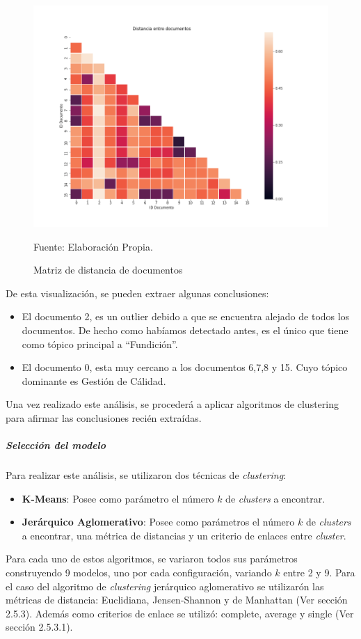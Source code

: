     \begin{figure}[H]
        \centering
        \includegraphics[width=1\textwidth]{figures/Clustering/distancia.png}
        \caption{\label{fig:DistanceMatrix} Matriz de distancia de documentos} Fuente: Elaboración Propia.
    \end{figure}
    
    De esta visualización, se pueden extraer algunas conclusiones:
    \begin{itemize}
        \item El documento 2, es un outlier debido a que se encuentra alejado de todos los documentos. De hecho como habíamos detectado antes, es el único que tiene como tópico principal a ``Fundición''. 
        \item El documento 0, esta muy cercano a los documentos 6,7,8 y 15. Cuyo tópico dominante es Gestión de Cálidad.
    \end{itemize}
    Una vez realizado este análisis, se procederá a aplicar algoritmos de clustering para afirmar las conclusiones recién extraídas.
\subparagraph{Selección del modelo}
\subparagraph*{}
    Para realizar este análisis, se utilizaron dos técnicas de \textit{clustering}: 
    \begin{itemize}
        \item \textbf{K-Means}: Posee como parámetro el número $k$ de \textit{clusters} a encontrar.
        \item \textbf{Jerárquico Aglomerativo}: Posee como parámetros el número $k$ de \textit{clusters} a encontrar, una métrica de distancias y un criterio de enlaces entre \textit{cluster}. 
    \end{itemize}
    Para cada uno de estos algoritmos, se variaron todos sus parámetros construyendo 9 modelos, uno por cada configuración, variando $k$ entre 2 y 9. Para el caso del algoritmo de \textit{clustering} jerárquico aglomerativo se utilizarón las métricas de distancia: Euclidiana, Jensen-Shannon y de Manhattan (Ver sección 2.5.3). Además como criterios de enlace se utilizó: complete, average y single (Ver sección 2.5.3.1). 
    
